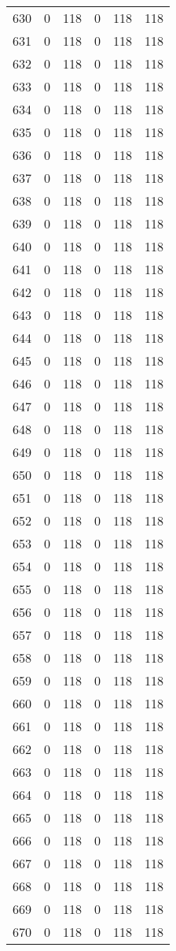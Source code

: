 \documentclass[a4paper]{ctexart}
\begin{document}
\begin{longtable}{p{1cm}|p{2cm}|p{2cm}|p{2cm}|P{2cm}|p{2cm}}
		630&0&118&0&118&118\\
		631&0&118&0&118&118\\
		632&0&118&0&118&118\\
		633&0&118&0&118&118\\
		634&0&118&0&118&118\\
		635&0&118&0&118&118\\
		636&0&118&0&118&118\\
		637&0&118&0&118&118\\
		638&0&118&0&118&118\\
		639&0&118&0&118&118\\
		640&0&118&0&118&118\\
		641&0&118&0&118&118\\
		642&0&118&0&118&118\\
		643&0&118&0&118&118\\
		644&0&118&0&118&118\\
		645&0&118&0&118&118\\
		646&0&118&0&118&118\\
		647&0&118&0&118&118\\
		648&0&118&0&118&118\\
		649&0&118&0&118&118\\
		650&0&118&0&118&118\\
		651&0&118&0&118&118\\
		652&0&118&0&118&118\\
		653&0&118&0&118&118\\
		654&0&118&0&118&118\\
		655&0&118&0&118&118\\
		656&0&118&0&118&118\\
		657&0&118&0&118&118\\
		658&0&118&0&118&118\\
		659&0&118&0&118&118\\
		660&0&118&0&118&118\\
		661&0&118&0&118&118\\
		662&0&118&0&118&118\\
		663&0&118&0&118&118\\
		664&0&118&0&118&118\\
		665&0&118&0&118&118\\
		666&0&118&0&118&118\\
		667&0&118&0&118&118\\
		668&0&118&0&118&118\\
		669&0&118&0&118&118\\
		670&0&118&0&118&118\\

\end{longtable}
\end{document}
